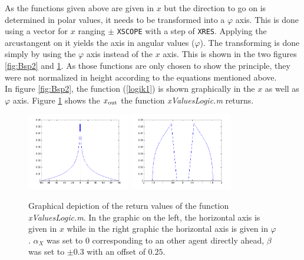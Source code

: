 \noi As the functions given above are given in $x$ but the direction to go on is determined in polar values, it needs to be transformed into a $\varphi$ axis. This is done using a vector for $x$ ranging $\pm$ \texttt{XSCOPE} with a step of \texttt{XRES}. Applying the arcustangent on it yields the axis in angular values ($\varphi$). The transforming is done simply by using the $\varphi$ axis instead of the $x$ axis. This is shown in the two figures \ref{fig:Bsp2} and \ref{fig:Bsp2Out}. As those functions are only chosen to show the principle, they were not normalized in height according to the equations mentioned above.\\
In figure \ref{fig:Bsp2}, the function (\ref{logik1}) is shown graphically in the $x$ as well as $\varphi$ axis. Figure \ref{fig:Bsp2Out} shows the $x_{\text{out}}$ the function \textit{xValuesLogic.m} returns.

\begin{figure}[h!]
	\centering
		\includegraphics[width=0.40\textwidth]{pictures/Bsp2Out}
		\includegraphics[width=0.40\textwidth]{pictures/Bsp2OutAngle}
	\caption{Graphical depiction of the return values of the function \textit{xValuesLogic.m}. In the graphic on the left, the horizontal axis is given in $x$ while in the right graphic the horizontal axis is given in $\varphi$. $\alpha_X$ was set to 0 corresponding to an other agent directly ahead, $\beta$ was set to $\pm 0.3$ with an offset of $0.25$.}
	\label{fig:Bsp2Out}
\end{figure}

